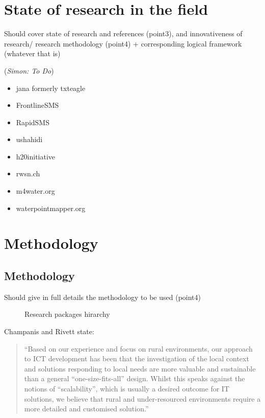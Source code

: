 \documentclass[11pt]{article}
\newcommand{\simon}[1]{\vspace{1em}(\emph{Simon: #1})\vspace{1em}}
\begin{document}
\section{State of research in the field}\label{state_of_research}
Should cover state of research and references (point3), and innovativeness of research/ research methodology (point4) + corresponding logical framework (whatever that is)

\simon{To Do}

\begin{itemize}
 \item jana formerly txteagle
 \item FrontlineSMS
 \item RapidSMS
 \item ushahidi
 \item h20initiative
 \item rwsn.ch
 \item m4water.org
 \item waterpointmapper.org
\end{itemize}


\section{Methodology}\label{methodology}
\subsection{Methodology}\label{metho}
Should give in full details the methodology to be used (point4)

\begin{figure}
\begin{center}
 
\end{center}
\caption{Research packages hirarchy}
\label{tikz:researchpackages}
\end{figure} 

Champanis and Rivett \cite{champanis2012reporting} state: \begin{quote}
``Based on our experience and focus on rural environments, our
approach to ICT development has been that the investigation of
the local context and solutions responding to local needs are more
valuable and sustainable than a general “one-size-fits-all” design.
Whilst this speaks against the notions of “scalability”, which is
usually a desired outcome for IT solutions, we believe that rural
and under-resourced environments require a more detailed and
customised solution.''\end{quote} 
\end{document}
